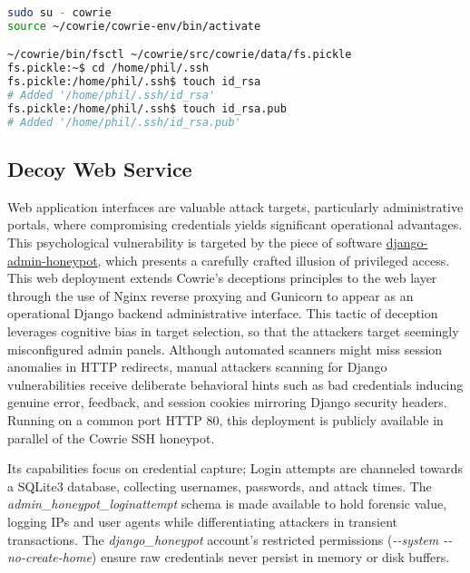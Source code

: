 \documentclass{cls/ULBreport}
\begin{document}
\begin{lstlisting}[language=bash,label={lst:cowrie-context},caption={Python Virtual Filesystem Controller}]  
sudo su - cowrie
source ~/cowrie/cowrie-env/bin/activate

~/cowrie/bin/fsctl ~/cowrie/src/cowrie/data/fs.pickle
fs.pickle:~$ cd /home/phil/.ssh
fs.pickle:/home/phil/.ssh$ touch id_rsa 
# Added '/home/phil/.ssh/id_rsa'
fs.pickle:/home/phil/.ssh$ touch id_rsa.pub 
# Added '/home/phil/.ssh/id_rsa.pub'\end{lstlisting}  


    \subsection{Decoy Web Service}
    
Web application interfaces are valuable attack targets, particularly administrative portals, where compromising credentials yields significant operational advantages. This psychological vulnerability is targeted by the piece of software \href{https://github.com/dmpayton/django-admin-honeypot}{django-admin-honeypot}, which presents a carefully crafted illusion of privileged access. This web deployment extends Cowrie's deceptions principles to the web layer through the use of Nginx reverse proxying and Gunicorn to appear as an operational Django backend administrative interface. This tactic of deception leverages cognitive bias in target selection, so that the attackers target seemingly misconfigured admin panels. Although automated scanners might miss session anomalies in HTTP redirects, manual attackers scanning for Django vulnerabilities receive deliberate behavioral hints such as bad credentials inducing genuine error, feedback, and session cookies mirroring Django security headers. Running on a common port HTTP 80, this deployment is publicly available in parallel of the Cowrie SSH honeypot. 

Its capabilities focus on credential capture; Login attempts are channeled towards a
SQLite3 database, collecting usernames, passwords, and attack times. The \textit{admin\_honeypot\_loginattempt} schema is made available to hold forensic value, logging IPs and user agents while differentiating attackers in transient transactions. The \textit{django\_honeypot} account's restricted permissions (\textit{-{-}system -{-}no-create-home}) ensure raw credentials never persist in memory or disk buffers.
    
\end{document}
